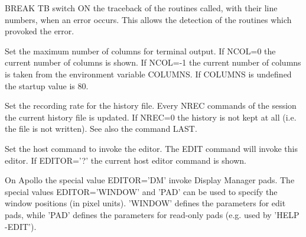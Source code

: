    \par
BREAK TB switch ON the traceback of the routines called, with their line 
   numbers, when an error occurs. This allows the detection of the routines 
   which provoked the error.  

\ENDCMD


\BEGARG
{}
\ENDARG

   \par
Set the maximum number of columns for terminal output.  If NCOL=0 the 
   current number of columns is shown.  If NCOL=-1 the current number of 
   columns is taken from the environment variable COLUMNS.  If COLUMNS is 
   undefined the startup value is 80.  

\ENDCMD


\BEGARG
{}
\ENDARG

   \par
Set the recording rate for the history file.  Every NREC commands of the 
   session the current history file is updated.  If NREC=0 the history is not 
   kept at all (i.e. the file is not written).  See also the command LAST.  

\ENDCMD


\BEGARG
{}
\ENDARG

   \par
Set the host command to invoke the editor.  The EDIT command will invoke 
   this editor.  If EDITOR='?' the current host editor command is shown.  

   \par
On Apollo the special value EDITOR='DM' invoke Display Manager pads.  The 
   special values EDITOR='WINDOW' and 'PAD' can be used to specify the window 
   positions (in pixel units).  'WINDOW' defines the parameters for edit pads, 
   while 'PAD' defines the parameters for read-only pads (e.g. used by 'HELP 
   -EDIT').  

